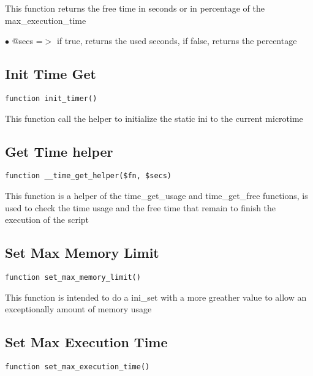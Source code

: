 \documentclass[a4paper]{book}
\begin{document}
This function returns the free time in seconds or in percentage of the max\_execution\_time

\begin{compactitem}
\item[\color{myblue}$\bullet$] @secs =$>$ if true, returns the used seconds, if false, returns the percentage
\end{compactitem}

\hypertarget{toc194}{}
\subsection{Init Time Get}

\begin{lstlisting}
function init_timer()
\end{lstlisting}

This function call the helper to initialize the static ini to the current microtime

\hypertarget{toc195}{}
\subsection{Get Time helper}

\begin{lstlisting}
function __time_get_helper($fn, $secs)
\end{lstlisting}

This function is a helper of the time\_get\_usage and time\_get\_free functions, is used to
check the time usage and the free time that remain to finish the execution of the script

\hypertarget{toc196}{}
\subsection{Set Max Memory Limit}

\begin{lstlisting}
function set_max_memory_limit()
\end{lstlisting}

This function is intended to do a ini\_set with a more greather value to allow an
exceptionally amount of memory usage

\hypertarget{toc197}{}
\subsection{Set Max Execution Time}

\begin{lstlisting}
function set_max_execution_time()
\end{lstlisting}
\end{document}

